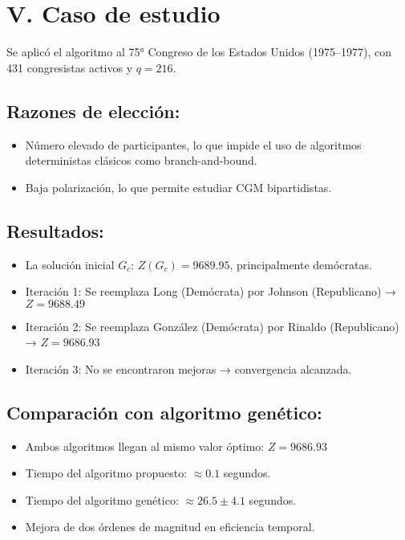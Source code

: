 \documentclass[12pt]{article}
\begin{document}
\section*{V. Caso de estudio}

Se aplicó el algoritmo al 75° Congreso de los Estados Unidos (1975–1977), con 431 congresistas activos y \( q = 216 \).

\subsection*{Razones de elección:}
\begin{itemize}
    \item Número elevado de participantes, lo que impide el uso de algoritmos deterministas clásicos como branch-and-bound.
    \item Baja polarización, lo que permite estudiar CGM bipartidistas.
\end{itemize}

\subsection*{Resultados:}
\begin{itemize}
    \item La solución inicial \( G_c \): \( Z(G_c) = 9689.95 \), principalmente demócratas.
    \item Iteración 1: Se reemplaza Long (Demócrata) por Johnson (Republicano) → \( Z = 9688.49 \)
    \item Iteración 2: Se reemplaza González (Demócrata) por Rinaldo (Republicano) → \( Z = 9686.93 \)
    \item Iteración 3: No se encontraron mejoras → convergencia alcanzada.
\end{itemize}

\subsection*{Comparación con algoritmo genético:}
\begin{itemize}
    \item Ambos algoritmos llegan al mismo valor óptimo: \( Z = 9686.93 \)
    \item Tiempo del algoritmo propuesto: \( \approx 0.1 \) segundos.
    \item Tiempo del algoritmo genético: \( \approx 26.5 \pm 4.1 \) segundos.
    \item Mejora de dos órdenes de magnitud en eficiencia temporal.
\end{itemize}
\end{document}
